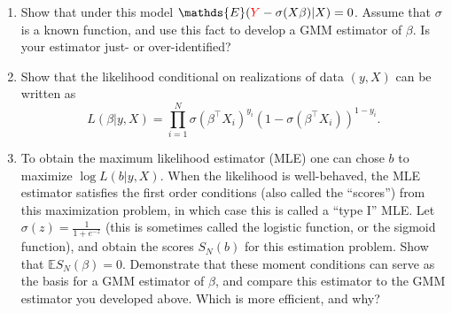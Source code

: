 \documentclass[12pt]{amsart}
\newcommand{\T}{\top}
\newcommand{\rv}[1]{\ensuremath{\textcolor{red}{#1}{}}}
\renewcommand{\E}{\ensuremath{\mathds{E}}}
\begin{document}
\begin{enumerate}
\item Show that under this model \(\E(\rv{Y}-\sigma(X\beta)|X)=0\).  Assume that \(\sigma\) is a known function, and use this fact to develop a GMM estimator of \(\beta\).  Is your estimator just- or over-identified?

\item Show that the likelihood conditional on realizations of data \((y,X)\) can be written as
\[    
            L(\beta|y,X) = \prod_{i=1}^N\sigma(\beta^\T X_i)^{y_i}\left(1-\sigma(\beta^\T X_i)\right)^{1-y_i}.
       \]
\item To obtain the maximum likelihood estimator (MLE) one can chose \(b\) to maximize \(\log L(b|y,X)\). When the likelihood is well-behaved, the MLE estimator satisfies the first order conditions (also called the ``scores'') from this maximization problem, in which case this is called a ``type I'' MLE.  Let \(\sigma(z)=\frac{1}{1+e^{-z}}\) (this is sometimes called the logistic function, or the sigmoid function), and obtain the scores \(S_N(b)\) for this estimation problem.  Show that \(\E S_N(\beta) = 0\).  Demonstrate that these moment conditions can serve as the basis for a GMM estimator of \(\beta\), and compare this estimator to the GMM estimator you developed above.  Which is more efficient, and why?
\end{enumerate}


\printbibliography
\end{document}
